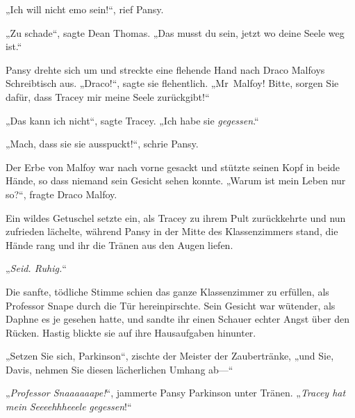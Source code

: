 „Ich will nicht emo sein!“, rief Pansy.

„Zu schade“, sagte Dean Thomas.
„Das musst du sein, jetzt wo deine Seele weg ist.“

Pansy drehte sich um und streckte eine flehende Hand nach Draco Malfoys Schreibtisch aus.
„Draco!“, sagte sie flehentlich.
„Mr~Malfoy! Bitte, sorgen Sie dafür, dass Tracey mir meine Seele zurückgibt!“

„Das kann ich nicht“, sagte Tracey.
„Ich habe sie \emph{gegessen}.“

„Mach, dass sie sie ausspuckt!“, schrie Pansy.

Der Erbe von Malfoy war nach vorne gesackt und stützte seinen Kopf in beide Hände, so dass niemand sein Gesicht sehen konnte.
„Warum ist mein Leben nur so?“, fragte Draco Malfoy.

Ein wildes Getuschel setzte ein, als Tracey zu ihrem Pult zurückkehrte und nun zufrieden lächelte, während Pansy in der Mitte des Klassenzimmers stand, die Hände rang und ihr die Tränen aus den Augen liefen.

„\emph{Seid. Ruhig.}“

Die sanfte, tödliche Stimme schien das ganze Klassenzimmer zu erfüllen, als Professor Snape durch die Tür hereinpirschte. Sein Gesicht war wütender, als Daphne es je gesehen hatte, und sandte ihr einen Schauer echter Angst über den Rücken. Hastig blickte sie auf ihre Hausaufgaben hinunter.

„Setzen Sie sich, Parkinson“, zischte der Meister der Zaubertränke, „und Sie, Davis, nehmen Sie diesen lächerlichen Umhang ab—“

„\emph{Professor Snaaaaaape!}“, jammerte Pansy Parkinson unter Tränen. „\emph{Tracey hat mein} \emph{Seeeehhheeele} \emph{gegessen}!“

